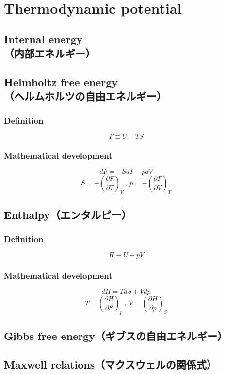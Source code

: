 %
%
%
%
%
\section{Thermodynamic potential}
\subsection{Internal energy\\（内部エネルギー）}



\subsection{Helmholtz free energy\\（ヘルムホルツの自由エネルギー）}
\subsubsection{Definition}
\[ F \equiv U - TS \]
\subsubsection{Mathematical development}
\[ dF = -SdT -pdV \]
\[ S = -{\left( \frac{ \partial F }{ \partial T } \right)}_V \ ,\  p=-{\left( \frac{ \partial F }{ \partial V } \right)}_T \]
\subsubsection{}
\subsubsection{}


\subsection{Enthalpy（エンタルピー）}
\subsubsection{Definition}
\[ H \equiv U + pV \]
\subsubsection{Mathematical development}
\[ dH = TdS + Vdp \]
\[ T = {\left( \frac{ \partial H }{ \partial S } \right)}_p \ ,\  V={\left( \frac{ \partial H }{ \partial p } \right)}_S \]



\subsection{Gibbs free energy（ギブスの自由エネルギー）}

\subsection{Maxwell relations（マクスウェルの関係式）}

